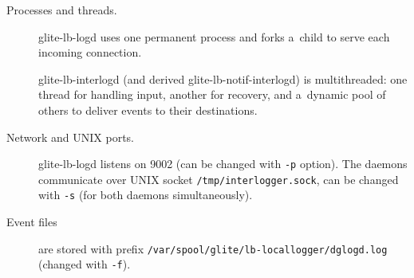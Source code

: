 \begin{description}
\item[Processes and threads.]
glite-lb-logd uses one permanent process and forks a~child to serve
each incoming connection.

glite-lb-interlogd (and derived glite-lb-notif-interlogd) is multithreaded:
one thread for handling input, another for recovery, and a~dynamic pool of others
to deliver events to their destinations.

\item[Network and UNIX ports.]
glite-lb-logd listens on 9002 (can be changed with \verb'-p' option).
The daemons communicate over UNIX socket \verb'/tmp/interlogger.sock',
can be changed with \verb'-s' (for both daemons simultaneously).

\item[Event files] are stored
with prefix \verb'/var/spool/glite/lb-locallogger/dglogd.log' (changed with \verb'-f').


\end{description}

